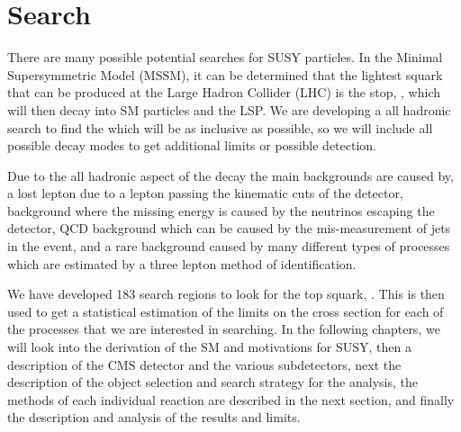 \section{Search}
\label{sec:search}

There are many possible potential searches for SUSY particles. In the Minimal Supersymmetric Model (MSSM), it can be determined that the lightest squark that can be produced at the Large Hadron Collider (LHC) is the stop, \st{}, which will then decay into SM particles and the LSP.  We are developing a all hadronic search to find the \st{} which will be as inclusive as possible, so we will include all possible decay modes to get additional limits or possible detection. 

Due to the all hadronic aspect of the decay the main backgrounds are caused by, a lost lepton due to a lepton passing the kinematic cuts of the detector, \Znunu{} background where the missing energy is caused by the neutrinos escaping the detector, QCD background which can be caused by the mis-measurement of jets in the event, and a rare background caused by many different types of processes which are estimated by a three lepton method of identification. 

We have developed 183 search regions to look for the top squark, \st{}. This is then used to get a statistical estimation of the limits on the cross section for each of the processes that we are interested in searching. In the following chapters, we will look into the derivation of the SM and motivations for SUSY, then a description of the CMS detector and the various subdetectors, next the description of the object selection and search strategy for the analysis, the methods of each individual reaction are described in the next section, and finally the description and analysis of the results and limits. 

